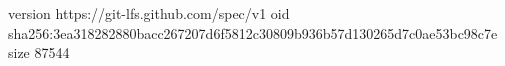 version https://git-lfs.github.com/spec/v1
oid sha256:3ea318282880bacc267207d6f5812c30809b936b57d130265d7c0ae53bc98c7e
size 87544
